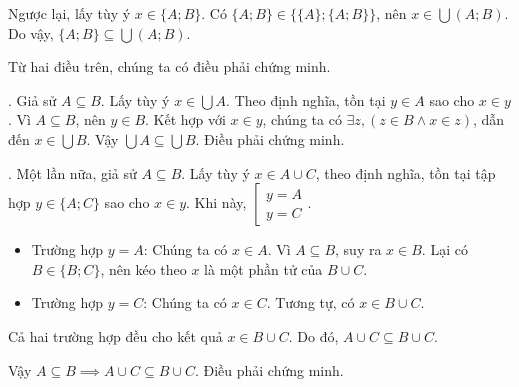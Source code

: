 Ngược lại, lấy tùy ý $x \in \{A; B\}$. Có $\{A; B\} \in \big\{\{A\}; \{A; B\}\big\}$, nên $x \in \bigcup (A; B)$. Do vậy, $\{A; B\} \subseteq \bigcup (A; B)$.

Từ hai điều trên, chúng ta có điều phải chứng minh.

. Giả sử $A \subseteq B$. Lấy tùy ý $x \in \bigcup A$. Theo định nghĩa, tồn tại $y \in A$ sao cho $x \in y$. Vì $A \subseteq B$, nên $y \in B$. Kết hợp với $x \in y$, chúng ta có $\exists z, (z \in B \land x \in z)$, dẫn đến $x \in \bigcup B$. Vậy $\bigcup A \subseteq \bigcup B$. Điều phải chứng minh.

. Một lần nữa, giả sử $A \subseteq B$. Lấy tùy ý $x \in A \cup C$, theo định nghĩa, tồn tại tập hợp $y \in \{A; C\}$ sao cho $x \in y$. Khi này, $\left[\begin{array}{l}
      y = A \\
      y = C
   \end{array}\right.$.
\begin{itemize}
   \item \textcolor{colorEmphasis}{Trường hợp $y = A$}: Chúng ta có $x \in A$. Vì $A \subseteq B$, suy ra $x \in B$. Lại có $B \in \{B; C\}$, nên kéo theo $x$ là một phần tử của $B \cup C$.
   \item \textcolor{colorEmphasisCyan}{Trường hợp $y = C$}: Chúng ta có $x \in C$. Tương tự, có $x \in B \cup C$.
\end{itemize}
Cả hai trường hợp đều cho kết quả $x \in B \cup C$. Do đó, $A \cup C \subseteq B \cup C$.

Vậy $A \subseteq B \implies A \cup C \subseteq B \cup C$. Điều phải chứng minh.

